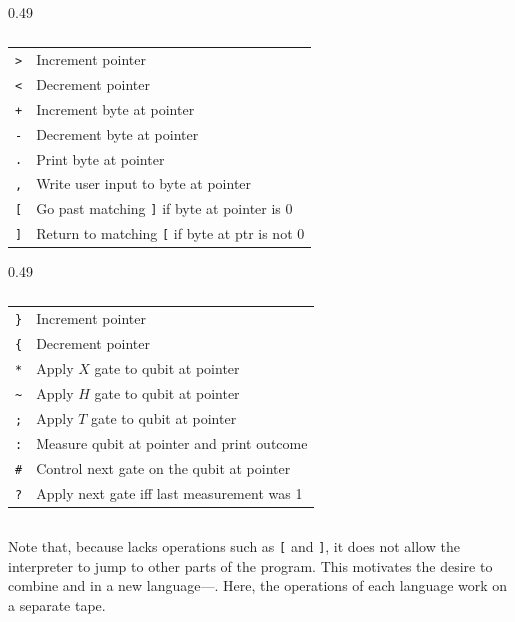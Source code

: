 \begin{table}[b]
  \caption{Operations the esolangs \bfck{} and \qbfck{} provide.}
  \label{tab:main}
  \centering
  \begin{subtable}[t]{0.49\linewidth}
    \caption{\bfck{}}
    \label{tab:bfck-commands}
    \centering
    \begin{tabular}{cl}
      \toprule
      \texttt{>} & Increment pointer \\
      \texttt{<} & Decrement pointer \\
      \texttt{+} & Increment byte at pointer \\
      \texttt{-} & Decrement byte at pointer \\
      \texttt{.} & Print byte at pointer \\
      \texttt{,} & Write user input to byte at pointer \\
      \texttt{[} & Go past matching \texttt{]} if byte at pointer is 0 \\
    \texttt{]} & Return to matching \texttt{[} if byte at ptr is not 0\\
      \bottomrule
    \end{tabular}
  \end{subtable}
  \begin{subtable}[t]{0.49\linewidth}
    \caption{\qbfck{}}
    \label{tab:bfq-commands}
    \centering
    \begin{tabular}{cl}
      \toprule
    \texttt{\}} & Increment pointer \\
    \texttt{\{} & Decrement pointer \\
      \texttt{*} & Apply $X$ gate to qubit at pointer \\
      \texttt{\~} & Apply $H$ gate to qubit at pointer \\
      \texttt{;} & Apply $T$ gate to qubit at pointer \\
      \texttt{:} & Measure qubit at pointer and print outcome \\
      \texttt{\#} & Control next gate on the qubit at pointer \\
      \texttt{?} & Apply next gate iff last measurement was 1 \\
      \bottomrule
    \end{tabular}
  \end{subtable}
\end{table}

\subsection{\bfq}
\label{sec:background-hb}

Note that, because \qbfck{} lacks operations such as \texttt{[} and \texttt{]}, it does not allow the interpreter to jump to other parts of the program. This motivates the desire to combine \bfck{} and \qbfck{} in a new language---\bfq{}. Here, the operations of each language work on a separate tape.
